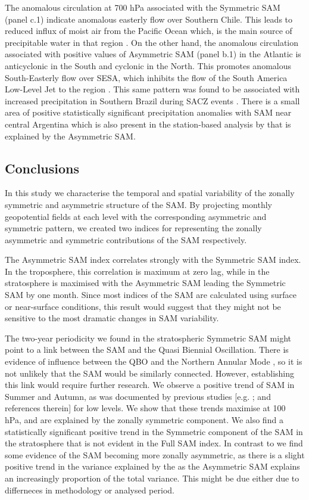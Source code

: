 \documentclass[smallextended]{svjour3}       %
\begin{document}
The anomalous circulation at 700 hPa associated with the Symmetric SAM (panel c.1) indicate anomalous easterly flow over Southern Chile. This leads to reduced influx of moist air from the Pacific Ocean which, is the main source of precipitable water in that region \citep[e.g.][]{garreaud2007}. On the other hand, the anomalous circulation associated with positive values of Asymmetric SAM (panel b.1) in the Atlantic is anticyclonic in the South and cyclonic in the North. This promotes anomalous South-Easterly flow over SESA, which inhibits the flow of the South America Low-Level Jet to the region \citep{silvestri2009, zamboni2010}. This same pattern was found to be associated with increased precipitation in Southern Brazil during SACZ events \citep{rosso2018}. There is a small area of positive statistically significant precipitation anomalies with SAM near central Argentina which is also present in the station-based analysis by \citet{gillett2006} that is explained by the Asymmetric SAM.

\hypertarget{conclusions}{%
\subsection{Conclusions}\label{conclusions}}

In this study we characterise the temporal and spatial variability of the zonally symmetric and asymmetric structure of the SAM. By projecting monthly geopotential fields at each level with the corresponding asymmetric and symmetric pattern, we created two indices for representing the zonally asymmetric and symmetric contributions of the SAM respectively.

The Asymmetric SAM index correlates strongly with the Symmetric SAM index. In the troposphere, this correlation is maximum at zero lag, while in the stratosphere is maximised with the Asymmetric SAM leading the Symmetric SAM by one month. Since most indices of the SAM are calculated using surface or near-surface conditions, this result would suggest that they might not be sensitive to the most dramatic changes in SAM variability.

The two-year periodicity we found in the stratospheric Symmetric SAM might point to a link between the SAM and the Quasi Biennial Oscillation. There is evidence of influence between the QBO and the Northern Annular Mode \citep[e.g.][]{holton1980, watson2014, zhang2020}, so it is not unlikely that the SAM would be similarly connected. However, establishing this link would require further research.
We observe a positive trend of SAM in Summer and Autumn, as was documented by previous studies {[}e.g. \citet{fogt2020}; and references therein{]} for low levels. We show that these trends maximise at 100 hPa, and are explained by the zonally symmetric component. We also find a statistically significant positive trend in the Symmetric component of the SAM in the stratosphere that is not evident in the Full SAM index. In contrast to \citet{fogt2012} we find some evidence of the SAM becoming more zonally asymmetric, as there is a slight positive trend in the variance explained by the as the Asymmetric SAM explains an increasingly proportion of the total variance. This might be due either due to differneces in methodology or analysed period.
\end{document}
